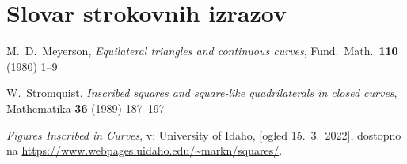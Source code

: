 \documentclass[mat1]{fmfdelo}
\begin{document}
\section*{Slovar strokovnih izrazov}

\geslo{}{}
\geslo{}{}

\begin{thebibliography}{99}

M.~D.~Meyerson, \emph{Equilateral triangles and continuous curves}, Fund.\ Math.\ \textbf{110} (1980) 1--9 

W.~Stromquist, \emph{Inscribed squares and square-like quadrilaterals in closed curves}, Mathematika \textbf{36} (1989) 187--197

\emph{Figures Inscribed in Curves}, v: University of Idaho, [ogled 15.~3.~2022], dostopno na \url{https://www.webpages.uidaho.edu/~markn/squares/}.

\end{thebibliography}
\end{document}

